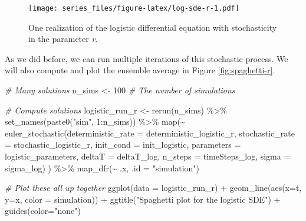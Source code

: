 \documentclass[
]{book}
\newenvironment{Shaded}{\begin{snugshade}}{\end{snugshade}}
\newcommand{\AttributeTok}[1]{\textcolor[rgb]{0.77,0.63,0.00}{#1}}
\newcommand{\CommentTok}[1]{\textcolor[rgb]{0.56,0.35,0.01}{\textit{#1}}}
\newcommand{\DecValTok}[1]{\textcolor[rgb]{0.00,0.00,0.81}{#1}}
\newcommand{\FunctionTok}[1]{\textcolor[rgb]{0.00,0.00,0.00}{#1}}
\newcommand{\NormalTok}[1]{#1}
\newcommand{\OtherTok}[1]{\textcolor[rgb]{0.56,0.35,0.01}{#1}}
\newcommand{\SpecialCharTok}[1]{\textcolor[rgb]{0.00,0.00,0.00}{#1}}
\newcommand{\StringTok}[1]{\textcolor[rgb]{0.31,0.60,0.02}{#1}}
\theoremstyle{definition}
\theoremstyle{definition}
\theoremstyle{definition}
\theoremstyle{remark}
\begin{document}
\begin{figure}
\centering
\texttt{[image: series\_files/figure-latex/log-sde-r-1.pdf]}
\caption{\label{fig:log-sde-r}One realization of the logistic differential equation with stochasticity in the parameter \emph{r}.}
\end{figure}

As we did before, we can run multiple iterations of this stochastic process. We will also compute and plot the ensemble average in Figure \ref{fig:spaghetti-r}.

\begin{Shaded}
\begin{Highlighting}[]
\CommentTok{\# Many solutions}
\NormalTok{n\_sims }\OtherTok{\textless{}{-}} \DecValTok{100}  \CommentTok{\# The number of simulations}

\CommentTok{\# Compute solutions}
\NormalTok{logistic\_run\_r }\OtherTok{\textless{}{-}} \FunctionTok{rerun}\NormalTok{(n\_sims) }\SpecialCharTok{\%\textgreater{}\%}
  \FunctionTok{set\_names}\NormalTok{(}\FunctionTok{paste0}\NormalTok{(}\StringTok{"sim"}\NormalTok{, }\DecValTok{1}\SpecialCharTok{:}\NormalTok{n\_sims)) }\SpecialCharTok{\%\textgreater{}\%}
  \FunctionTok{map}\NormalTok{(}\SpecialCharTok{\textasciitilde{}} \FunctionTok{euler\_stochastic}\NormalTok{(}\AttributeTok{deterministic\_rate =}\NormalTok{ deterministic\_logistic\_r,}
                             \AttributeTok{stochastic\_rate =}\NormalTok{ stochastic\_logistic\_r,}
                             \AttributeTok{init\_cond =}\NormalTok{ init\_logistic,}
                             \AttributeTok{parameters =}\NormalTok{ logistic\_parameters,}
                             \AttributeTok{deltaT =}\NormalTok{ deltaT\_log,}
                             \AttributeTok{n\_steps =}\NormalTok{ timeSteps\_log,}
                             \AttributeTok{sigma =}\NormalTok{ sigma\_log)}
\NormalTok{) }\SpecialCharTok{\%\textgreater{}\%}
  \FunctionTok{map\_dfr}\NormalTok{(}\SpecialCharTok{\textasciitilde{}}\NormalTok{ .x, }\AttributeTok{.id =} \StringTok{"simulation"}\NormalTok{)}


\CommentTok{\# Plot these all up together}
  \FunctionTok{ggplot}\NormalTok{(}\AttributeTok{data =}\NormalTok{ logistic\_run\_r) }\SpecialCharTok{+}
  \FunctionTok{geom\_line}\NormalTok{(}\FunctionTok{aes}\NormalTok{(}\AttributeTok{x=}\NormalTok{t, }\AttributeTok{y=}\NormalTok{x, }\AttributeTok{color =}\NormalTok{ simulation)) }\SpecialCharTok{+}
  \FunctionTok{ggtitle}\NormalTok{(}\StringTok{"Spaghetti plot for the logistic SDE"}\NormalTok{) }\SpecialCharTok{+}
  \FunctionTok{guides}\NormalTok{(}\AttributeTok{color=}\StringTok{"none"}\NormalTok{)}
\end{Highlighting}
\end{Shaded}
\end{document}
